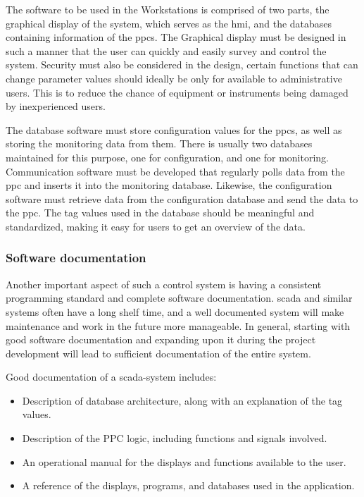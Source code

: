 \documentclass[main.tex]{subfiles}
\begin{document}
The software to be used in the Workstations is comprised of two parts, the graphical display of the system, which serves as the \gls{hmi}, and the databases containing information of the \gls{ppc}s. The Graphical display must be designed in such a manner that the user can quickly and easily survey and control the system. Security must also be considered in the design, certain functions that can change parameter values should ideally be only for available to administrative users. This is to reduce the chance of equipment or instruments being damaged by inexperienced users.

The database software must store configuration values for the \gls{ppc}s, as well as storing the monitoring data from them. There is usually two databases maintained for this purpose, one for configuration, and one for monitoring. Communication software must be developed that regularly polls data from the \gls{ppc} and inserts it into the monitoring database. Likewise, the configuration software must retrieve data from the configuration database and send the data to the \gls{ppc}. The tag values used in the database should be meaningful and standardized, making it easy for users to get an overview of the data.



\subsubsection{Software documentation}
Another important aspect of such a control system is having a consistent programming standard and complete software documentation. \gls{scada} and similar systems often have a long shelf time, and a well documented system will make maintenance and work in the future more manageable. In general, starting with good software documentation and expanding upon it during the project development will lead to sufficient documentation of the entire system.

Good documentation of a \gls{scada}-system includes:

\begin{itemize}
    \item Description of database architecture, along with an explanation of the tag values.
    \item Description of the PPC logic, including functions and signals involved.
    \item An operational manual for the displays and functions available to the user.
    \item A reference of the displays, programs, and databases used in the application.
\end{itemize}
\end{document}
